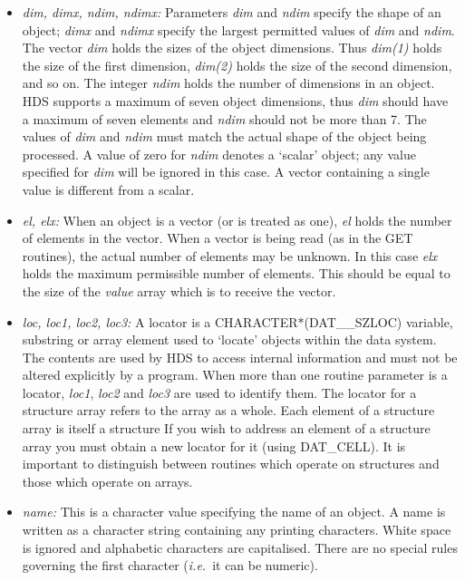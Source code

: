 \begin{itemize}

\item {\em dim, dimx, ndim, ndimx:}
Parameters {\em dim} and {\em ndim} specify the shape of an object; {\em dimx}
and {\em ndimx} specify the largest permitted values of {\em dim} and {\em
ndim}. The vector {\em dim} holds the sizes of the object dimensions. Thus {\em
dim(1)} holds the size of the first dimension, {\em dim(2)} holds the size of
the second dimension, and so on. The integer {\em ndim} holds the number of
dimensions in an object. HDS supports a maximum of seven object dimensions,
thus {\em dim} should have a maximum of seven elements and {\em ndim} should
not be more than 7. The values of {\em dim} and {\em ndim} must match the
actual shape of the object being processed. A value of zero for {\em ndim}
denotes a `scalar' object; any value specified for {\em dim} will be ignored in
this case. A vector containing a single value is different from a scalar.

\item {\em el, elx:}
When an object is a vector (or is treated as one), {\em el} holds the number of
elements in the vector. When a vector is being read (as in the GET
routines), the actual number of elements may be unknown. In this case {\em elx}
holds the maximum permissible number of elements. This should be equal to the
size of the {\em value} array which is to receive the vector.

\item {\em loc, loc1, loc2, loc3:}
A locator is a CHARACTER$*$(DAT\_\_SZLOC) variable, substring or array element
used to `locate' objects within the data system. The contents are used by HDS
to access internal information and must not be altered explicitly by a program.
When more than one routine parameter is a locator, {\em loc1}, {\em loc2} and
{\em loc3} are used to identify them. The locator for a structure array refers
to the array as a whole. Each element of a structure array is itself a
structure If you wish to address an element of a structure array you must
obtain a new locator for it (using DAT\_CELL). It is important to
distinguish between routines which operate on structures and those which
operate on arrays.

\item {\em name:}
This is a character value specifying the name of an object. A name is written
as a character string containing any printing characters. White space is
ignored and alphabetic characters are capitalised. There are no special rules
governing the first character ({\em i.e.}\ it can be numeric).


\end{itemize}
